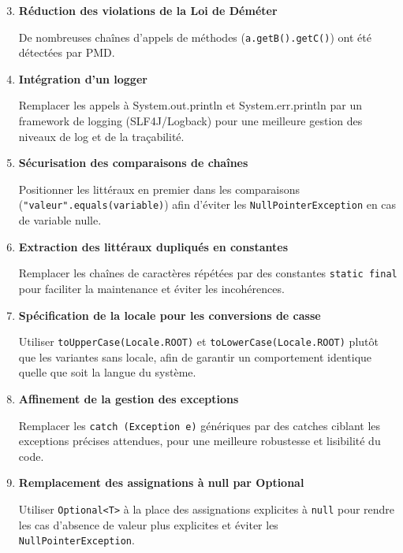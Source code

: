 \documentclass[a4paper]{article}
\begin{document}
\begin{enumerate}
    \setcounter{enumi}{2}
    \item \textbf{Réduction des violations de la Loi de Déméter}
    
    De nombreuses chaînes d'appels de méthodes (\texttt{a.getB().getC()}) ont été détectées 
    par PMD.

    \item \textbf{Intégration d'un logger}

    Remplacer les appels à System.out.println et System.err.println par un framework de logging (SLF4J/Logback) 
    pour une meilleure gestion des niveaux de log et de la traçabilité.

    \item \textbf{Sécurisation des comparaisons de chaînes}

    Positionner les littéraux en premier dans les comparaisons (\texttt{"valeur".equals(variable)}) 
    afin d'éviter les \texttt{NullPointerException} en cas de variable nulle.

    \item \textbf{Extraction des littéraux dupliqués en constantes}
    
    Remplacer les chaînes de caractères répétées par des constantes \texttt{static final} 
    pour faciliter la maintenance et éviter les incohérences.

    \item \textbf{Spécification de la locale pour les conversions de casse}
    
    Utiliser \texttt{toUpperCase(Locale.ROOT)} et \texttt{toLowerCase(Locale.ROOT)} 
    plutôt que les variantes sans locale, afin de garantir un comportement identique quelle que soit la langue du système.

    \item \textbf{Affinement de la gestion des exceptions}
    
    Remplacer les \texttt{catch (Exception e)} génériques par des catches ciblant 
    les exceptions précises attendues, pour une meilleure robustesse et lisibilité du code.

    \item \textbf{Remplacement des assignations à null par Optional}
    
    Utiliser \texttt{Optional<T>} à la place des assignations explicites à \texttt{null} 
    pour rendre les cas d'absence de valeur plus explicites et éviter les \texttt{NullPointerException}.

\end{enumerate}
\end{document}
